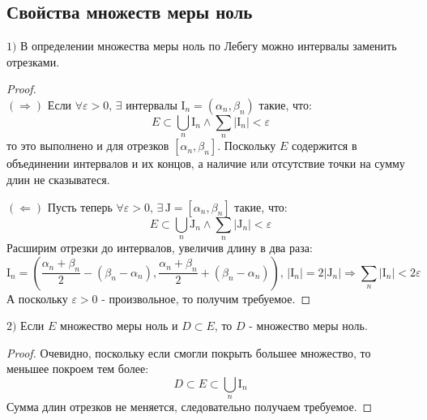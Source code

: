 \documentclass[12pt]{article}
\newcommand{\MI}{\mathrm{I}}
\newcommand{\MJ}{\mathrm{J}}
\newcommand{\VE}{\varepsilon}
\theoremstyle{definition}
\begin{document}
\subsection*{Свойства множеств меры ноль}
$1)$ В определении множества меры ноль по Лебегу можно интервалы заменить отрезками.
\begin{proof}\hfill \\
	$(\Rightarrow)$ Если $\forall \VE > 0, \, \exists$ интервалы $\MI_n = (\alpha_n, \beta_n)$ такие, что: 
	$$
		E \subset \displaystyle \bigcup\limits_n \MI_n \wedge \sum\limits_{n}|\MI_n| < \VE
	$$ 
	то это выполнено и для отрезков $[\alpha_n,\beta_n]$. Поскольку $E$ содержится в объединении интервалов и их концов, а наличие или отсутствие точки  на сумму длин не сказыватеся. 
	
	$(\Leftarrow)$ Пусть теперь $\forall \VE > 0, \, \exists \, \MJ = [\alpha_n, \beta_n]$ такие, что:
	$$
		E \subset \bigcup\limits_n \MJ_n \wedge  \sum\limits_{n}|\MJ_n| < \VE
	$$
	Расширим отрезки до интервалов, увеличив длину в два раза:
	$$
		\MI_n = \left(\dfrac{\alpha_n + \beta_n}{2} - (\beta_n - \alpha_n),\dfrac{\alpha_n + \beta_n}{2} + (\beta_n - \alpha_n) \right), \, |\MI_n| = 2|\MJ_n| \Rightarrow  \sum\limits_{n}|\MI_n| < 2\VE
	$$
	А поскольку $\VE > 0$ - произвольное, то получим требуемое.
\end{proof}

$2)$ Если $E$ множество меры ноль и $D \subset E$, то $D$ - множество меры ноль.
\begin{proof}
	Очевидно, поскольку если смогли покрыть большее множество, то меньшее покроем тем более:
	$$
		D \subset E \subset \displaystyle \bigcup\limits_n \MI_n
	$$
	Сумма длин отрезков не меняется, следовательно получаем требуемое.
\end{proof}
\end{document}
